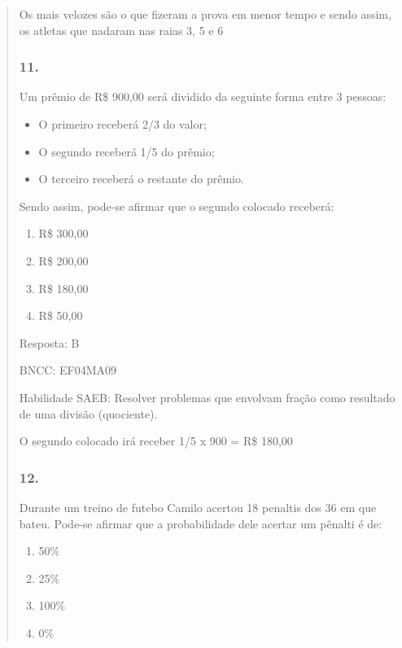 \begin{enumerate}
\begin{escolha}
\begin{enumerate}
\begin{itemize}
\begin{itemize}
\begin{escolha}
\begin{quote}
\begin{escolha}
{Os mais velozes são o que fizeram a prova em menor tempo e sendo assim,
os atletas que nadaram nas raias 3, 5 e 6

\subsubsection{11.}\label{section-182}

Um prêmio de R\$ 900,00 será dividido da seguinte forma entre 3 pessoas:

\begin{itemize}
\item
  O primeiro receberá 2/3 do valor;
\item
  O segundo receberá 1/5 do prêmio;
\item
  O terceiro receberá o restante do prêmio.
\end{itemize}

Sendo assim, pode-se afirmar que o segundo colocado receberá:

\begin{enumerate}
\def\labelenumi{\alph{enumi})}
\item
  R\$ 300,00
\item
  R\$ 200,00
\item
  R\$ 180,00
\item
  R\$ 50,00
\end{enumerate}

Resposta: B

BNCC: EF04MA09

Habilidade SAEB: Resolver problemas que envolvam fração como resultado
de uma divisão (quociente).

O segundo colocado irá receber 1/5 x 900 = R\$ 180,00

\subsubsection{12.}\label{section-183}

Durante um treino de futebo Camilo acertou 18 penaltis dos 36 em que
bateu. Pode-se afirmar que a probabilidade dele acertar um pênalti é de:

\begin{enumerate}
\def\labelenumi{\alph{enumi})}
\item
  50\%
\item
  25\%
\item
  100\%
\item
  0\%
\end{enumerate}

}
\end{escolha}
\end{quote}
\end{escolha}
\end{itemize}
\end{itemize}
\end{enumerate}
\end{escolha}
\end{enumerate}
